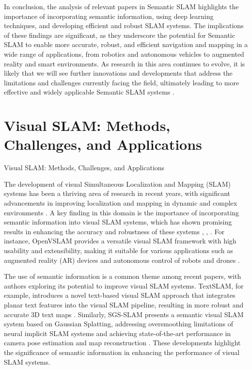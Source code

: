 \documentclass[conference]{IEEEtran}
\begin{document}
In conclusion, the analysis of relevant papers in Semantic SLAM highlights the importance of incorporating semantic information, using deep learning techniques, and developing efficient and robust SLAM systems. The implications of these findings are significant, as they underscore the potential for Semantic SLAM to enable more accurate, robust, and efficient navigation and mapping in a wide range of applications, from robotics and autonomous vehicles to augmented reality and smart environments. As research in this area continues to evolve, it is likely that we will see further innovations and developments that address the limitations and challenges currently facing the field, ultimately leading to more effective and widely applicable Semantic SLAM systems \cite{b10}.

\section{Visual SLAM: Methods, Challenges, and Applications}
Visual SLAM: Methods, Challenges, and Applications

The development of visual Simultaneous Localization and Mapping (SLAM) systems has been a thriving area of research in recent years, with significant advancements in improving localization and mapping in dynamic and complex environments \cite{b1}. A key finding in this domain is the importance of incorporating semantic information into visual SLAM systems, which has shown promising results in enhancing the accuracy and robustness of these systems \cite{b1}, \cite{b3}, \cite{b5}. For instance, OpenVSLAM provides a versatile visual SLAM framework with high usability and extensibility, making it suitable for various applications such as augmented reality (AR) devices and autonomous control of robots and drones \cite{b2}.

The use of semantic information is a common theme among recent papers, with authors exploring its potential to improve visual SLAM systems. TextSLAM, for example, introduces a novel text-based visual SLAM approach that integrates planar text features into the visual SLAM pipeline, resulting in more robust and accurate 3D text maps \cite{b3}. Similarly, SGS-SLAM presents a semantic visual SLAM system based on Gaussian Splatting, addressing oversmoothing limitations of neural implicit SLAM systems and achieving state-of-the-art performance in camera pose estimation and map reconstruction \cite{b5}. These developments highlight the significance of semantic information in enhancing the performance of visual SLAM systems.
\end{document}
